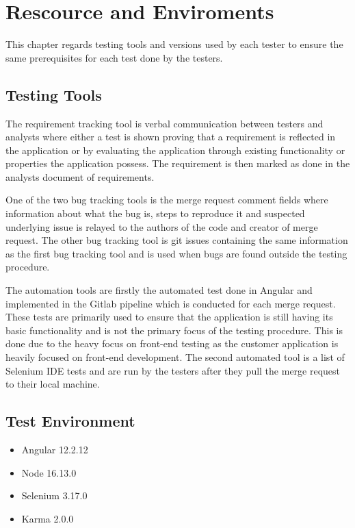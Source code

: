 \section{Rescource and Enviroments}
This chapter regards testing tools and versions used by each tester to ensure the same prerequisites for each test done by the testers.

\subsection{Testing Tools}
The requirement tracking tool is verbal communication between testers and analysts where either a test is shown proving that a requirement is reflected in the application or by evaluating the application through existing functionality or properties the application possess. The requirement is then marked as done in the analysts document of requirements.\newline

\noindent One of the two bug tracking tools is the merge request comment fields where information about what the bug is, steps to reproduce it and suspected underlying issue is relayed to the authors of the code and creator of merge request. The other bug tracking tool is git issues containing the same information as the first bug tracking tool and is used when bugs are found outside the testing procedure.\newline

\noindent The automation tools are firstly the automated test done in Angular and implemented in the Gitlab pipeline which is conducted for each merge request. These tests are primarily used to ensure that the application is still having its basic functionality and is not the primary focus of the testing procedure. This is done due to the heavy focus on front-end testing as the customer application is heavily focused on front-end development. The second automated tool is a list of Selenium IDE tests and are run by the testers after they pull the merge request to their local machine.

\subsection{Test Environment}
\begin{itemize}
  \item Angular 12.2.12
  \item Node 16.13.0
  \item Selenium 3.17.0
  \item Karma 2.0.0
  
\end{itemize}
